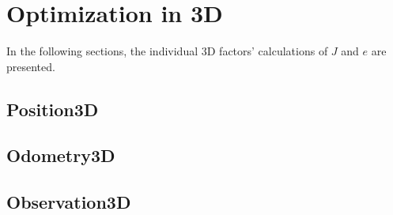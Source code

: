 \section{Optimization in 3D}
\label{optimization_3d}
In the following sections, the individual 3D factors' calculations of $J$ and $e$ are presented.



\subsection{Position3D}



\subsection{Odometry3D}



\subsection{Observation3D}
